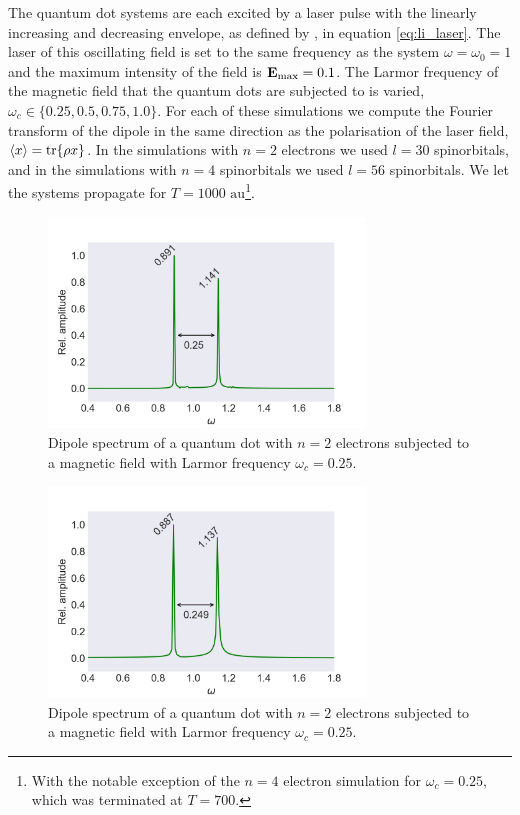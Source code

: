 The quantum dot systems are each excited by a laser pulse with the linearly increasing 
and decreasing envelope, as defined by \citeauthor{li2005time}\cite{li2005time}, in 
equation \autoref{eq:li_laser}. The laser of this oscillating field is set to the 
same frequency as the system $\omega=\omega_0=1$ and the maximum intensity of the field 
is $\vb{E}_\text{max} = 0.1$. The Larmor frequency of the magnetic field that the 
quantum dots are subjected to is varied, $\omega_c\in\{0.25, 0.5, 0.75, 1.0\}$.
For each of these simulations we compute the Fourier transform of the dipole in 
the same direction as the polarisation of the laser field, $\ev{x} =\tr{\rho x}$.
In the simulations with $n=2$ electrons we used $l=30$ spinorbitals,
and in the simulations with $n=4$ spinorbitals we used $l=56$ spinorbitals.
We let the systems propagate for $T = 1000 \text{ au}$\footnote{With the notable 
exception of the $n=4$ electron simulation for $\omega_c=0.25$, which was terminated 
at $T=700$.}.

\begin{figure}
    \centering
    \includegraphics[width=0.75\textwidth]
        {results/figures/B_field/n=2/b_spectrum_omc025.png}
    \caption{Dipole spectrum of a quantum dot with $n=2$ electrons
    subjected to a magnetic field with Larmor frequency $\omega_c=0.25$.} 
    \label{fig:b_n2_omc025}
\end{figure}

\begin{figure}
    \centering    
    \includegraphics[width=0.75\textwidth]
        {results/figures/B_field/n=4/b_spectrum_n=4_omc=025.png}
    \caption{Dipole spectrum of a quantum dot with $n=2$ electrons
    subjected to a magnetic field with Larmor frequency $\omega_c=0.25$.}
    \label{fig:b_n4_omc025}
\end{figure}

